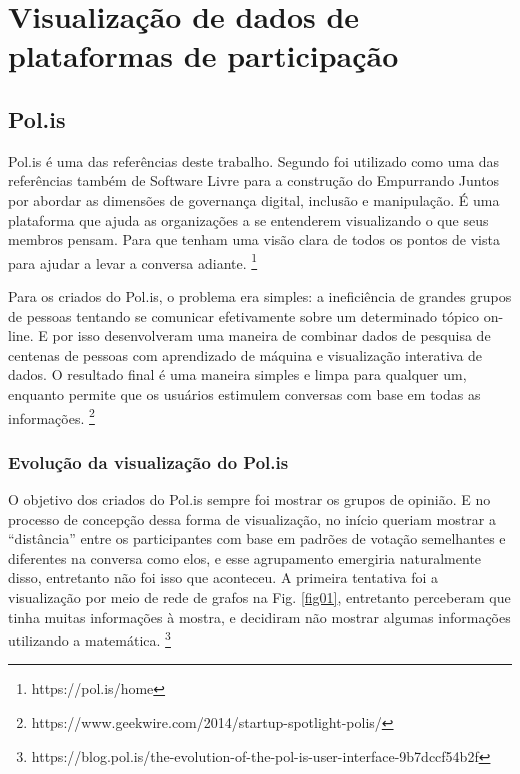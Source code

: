 \chapter{Visualização de dados de plataformas de participação}
\section{Pol.is}

Pol.is é uma das referências deste trabalho. Segundo \cite{poppi2017} foi utilizado como uma das referências também de Software Livre para a construção do Empurrando Juntos por abordar as dimensões de governança digital, inclusão e manipulação. É uma plataforma que ajuda as organizações a se entenderem visualizando o que seus membros pensam. Para que tenham uma visão clara de todos os pontos de vista para ajudar a levar a conversa adiante. \footnote{https://pol.is/home}

Para os criados do Pol.is, o problema era simples: a ineficiência de  grandes grupos de pessoas tentando se comunicar efetivamente sobre um determinado tópico on-line. E por isso desenvolveram uma maneira de combinar dados de pesquisa de centenas de pessoas com aprendizado de máquina e visualização interativa de dados. O resultado final é uma maneira simples e limpa para qualquer um, enquanto permite que os usuários estimulem conversas com base em todas as informações. \footnote{https://www.geekwire.com/2014/startup-spotlight-polis/}

\subsection{Evolução da visualização do Pol.is}

O objetivo dos criados do Pol.is sempre foi mostrar os grupos de opinião. E no processo de concepção dessa forma de visualização, no início queriam mostrar a “distância” entre os participantes com base em padrões de votação semelhantes e diferentes na conversa como elos, e esse agrupamento emergiria naturalmente disso, entretanto não foi isso que aconteceu. A primeira tentativa foi a visualização por meio de rede de grafos na Fig. \ref{fig01}, entretanto perceberam que tinha muitas informações à mostra, e decidiram não mostrar algumas informações utilizando a matemática. \footnote{https://blog.pol.is/the-evolution-of-the-pol-is-user-interface-9b7dccf54b2f}


